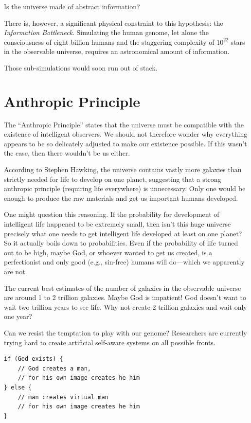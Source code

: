 Is the universe made of abstract information? 

There is, however, a significant physical constraint to this hypothesis: the \textit{Information Bottleneck}.
Simulating the human genome, let alone the consciousness of eight billion humans and the staggering complexity of $10^{22}$ stars in the observable universe, requires an astronomical amount of information. 

Those sub-simulations would soon run out of stack.



\section{Anthropic Principle}

The ``Anthropic Principle'' states that the universe must be compatible with the existence of intelligent observers.
We should not therefore wonder why everything appears to be so delicately adjusted to make our existence possible.
If this wasn't the case, then there wouldn't be us either.

According to Stephen Hawking, the universe contains vastly more galaxies than strictly needed for life to develop on one planet, suggesting that a strong anthropic principle (requiring life everywhere) is unnecessary.
Only one would be enough to produce the raw materials and get us important humans developed.

One might question this reasoning. If the probability for development of intelligent life happened to be extremely small, then isn't this huge universe precisely what one needs to get intelligent life developed at least on one planet?
So it actually boils down to probabilities.
Even if the probability of life turned out to be high, maybe God, or whoever wanted to get us created, is a perfectionist and only good (e.g., sin-free) humans will do—which we apparently are not.

The current best estimates of the number of galaxies in the observable universe are around 1 to 2 trillion galaxies.
Maybe God is impatient! God doesn't want to wait two trillion years to see life. Why not create 2 trillion galaxies and wait only one year?

Can we resist the temptation to play with our genome? Researchers are currently trying hard to create artificial self-aware systems on all possible fronts.

\begin{verbatim}
if (God exists) {
    // God creates a man, 
    // for his own image creates he him
} else {
    // man creates virtual man 
    // for his own image creates he him
}
\end{verbatim}

